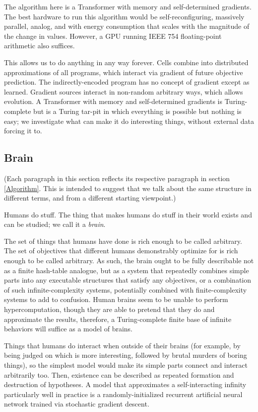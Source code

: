\documentclass{article}
\begin{document}
The algorithm here is a Transformer with memory and self-determined gradients. The best hardware to run this algorithm would be self-reconfiguring, massively parallel, analog, and with energy consumption that scales with the magnitude of the change in values. However, a GPU running IEEE 754 floating-point arithmetic also suffices.

This allows us to do anything in any way forever. Cells combine into distributed approximations of all programs, which interact via gradient of future objective prediction. The indirectly-encoded program has no concept of gradient except as learned. Gradient sources interact in non-random arbitrary ways, which allows evolution. A Transformer with memory and self-determined gradients is Turing-complete but is a Turing tar-pit \cite{10.1145/947955.1083808} in which everything is possible but nothing is easy; we investigate what can make it do interesting things, without external data forcing it to.

\subsection{Brain}

(Each paragraph in this section reflects its respective paragraph in section \ref{Algorithm}. This is intended to suggest that we talk about the same structure in different terms, and from a different starting viewpoint.)

Humans do stuff. The thing that makes humans do stuff in their world exists and can be studied; we call it a \textit{brain}.

The set of things that humans have done is rich enough to be called arbitrary. The set of objectives that different humans demonstrably optimize for is rich enough to be called arbitrary. As such, the brain ought to be fully describable not as a finite hash-table analogue, but as a system that repeatedly combines simple parts into any executable structures that satisfy any objectives, or a combination of such infinite-complexity systems, potentially combined with finite-complexity systems to add to confusion. Human brains seem to be unable to perform hypercomputation, though they are able to pretend that they do and approximate the results, therefore, a Turing-complete finite base of infinite behaviors will suffice as a model of brains.

Things that humans do interact when outside of their brains (for example, by being judged on which is more interesting, followed by brutal murders of boring things), so the simplest model would make its simple parts connect and interact arbitrarily too. Then, existence can be described as repeated formation and destruction of hypotheses. A model that approximates a self-interacting infinity particularly well in practice is a randomly-initialized recurrent artificial neural network trained via stochastic gradient descent.
\end{document}
